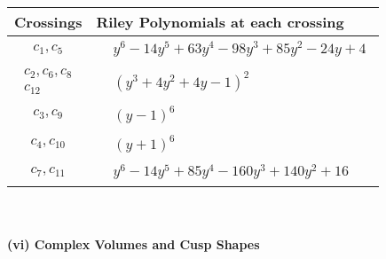 \documentclass[1p]{elsarticle_modified}
\theoremstyle{definition}
\begin{document}
\begin{tabular}{m{50pt}|m{274pt}}
Crossings & \hspace{64pt}Riley Polynomials at each crossing \\
\hline $$\begin{aligned}c_{1},c_{5}\end{aligned}$$&$\begin{aligned}
&y^6-14 y^5+63 y^4-98 y^3+85 y^2-24 y+4
\end{aligned}$\\
\hline $$\begin{aligned}c_{2},c_{6},c_{8}\\c_{12}\end{aligned}$$&$\begin{aligned}
&(y^3+4 y^2+4 y-1)^2
\end{aligned}$\\
\hline $$\begin{aligned}c_{3},c_{9}\end{aligned}$$&$\begin{aligned}
&(y-1)^6
\end{aligned}$\\
\hline $$\begin{aligned}c_{4},c_{10}\end{aligned}$$&$\begin{aligned}
&(y+1)^6
\end{aligned}$\\
\hline $$\begin{aligned}c_{7},c_{11}\end{aligned}$$&$\begin{aligned}
&y^6-14 y^5+85 y^4-160 y^3+140 y^2+16
\end{aligned}$\\
\hline
\end{tabular}\\~\\
\newpage\flushleft \textbf{(vi) Complex Volumes and Cusp Shapes}
\end{document}
